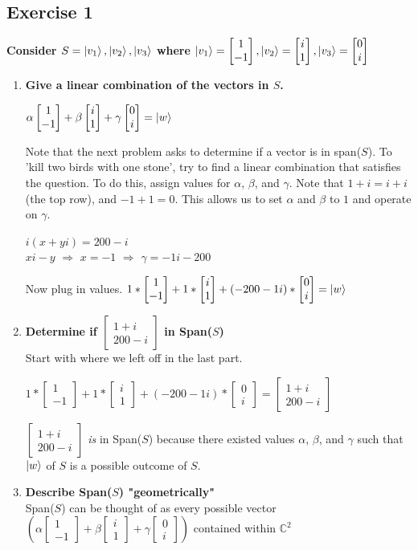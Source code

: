 \documentclass[12pt]{article}
\theoremstyle{plain}
\theoremstyle{nonumberplain}
\theoremstyle{plain}
\theoremstyle{nonumberplain}
\newcommand\1{{\bf 1}}
\newcommand{\bmat}[1]{\begin{bmatrix*} #1 \end{bmatrix*}} %
\newcommand{\C}{\mathbb{C}} %
\newcommand{\<}{\left\langle}
\renewcommand{\>}{\right\rangle}
\begin{document}

\subsection{Exercise 1}
\textbf{Consider $S={\ket{v_1}, \ket{v_2}, \ket{v_3}}$ where $\ket{v_1}=\bmat{1 \\ -1}, \ket{v_2}=\bmat{i \\ 1}, \ket{v_3}=\bmat{0 \\ i}$}
\begin{enumerate}[label=(\alph*)]
	\item \textbf{Give a linear combination of the vectors in $S$.} \\
	\begin{center}
	$\alpha\bmat{1 \\ -1} + \beta\bmat{i \\ 1} + \gamma\bmat{0 \\ i}=\ket{w}$ \\
	\end{center}
	Note that the next problem asks to determine if a vector is in span($S$). To 'kill two birds with 		one stone', try to find a linear combination that 			satisfies the question. To do this, assign 			values for $\alpha$, $\beta$, and $\gamma$. Note that $1+i=i+i$ (the top row), and $-1+1=0$. This
	allows us to set $\alpha$ and $\beta$ to $1$ and operate on $\gamma$.
	\begin{center}
	$i(x+yi)=200-i$ \\
	$xi-y$ $\Longrightarrow$ $x=-1$ $\Longrightarrow$ $\gamma=-1i-200$
	\end{center}
	Now plug in values.
	$1*\bmat{1 \\ -1} + 1*\bmat{i \\ 1} + (-200-1i)*\bmat{0 \\ i}=\ket{w}$
	\item \textbf{Determine if $\bmat{1+i \\ 200-i}$ in Span($S$)} \\
	Start with where we left off in the last part.
	\begin{center}
	$1*\bmat{1 \\ -1} + 1*\bmat{i \\ 1} + (-200-1i)*\bmat{0 \\ i}=\bmat{1+i \\ 200-i}$
	\end{center}
	$\bmat{1+i \\ 200-i}$ \textit{is} in Span($S$) because there existed values $\alpha$, $\beta$, and 	$\gamma$ such that $\ket{w}$ of $S$ is a possible outcome of $S$.
	\item \textbf{Describe Span($S$) "geometrically"} \\
	Span($S$) can be thought of as every possible vector $(\alpha\bmat{1 \\ -1} + \beta\bmat{i \\ 1} + 	\gamma\bmat{0 \\ i})$ contained within $\C^2$
	
\end{enumerate}
\end{document}
